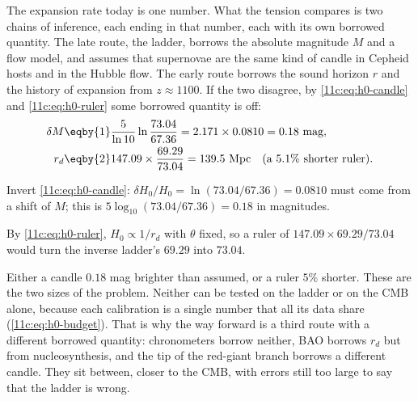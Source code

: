 The expansion rate today is one number. What the tension compares is two chains of
inference, each ending in that number, each with its own borrowed quantity. The late
route, the ladder, borrows the absolute magnitude $M$ and a flow model, and assumes that supernovae are the same
kind of candle in Cepheid hosts and in the Hubble flow. The early route borrows the
sound horizon $r$ and the history of expansion from $z\approx1100$. If the two disagree,
by \eqref{11c:eq:h0-candle} and \eqref{11c:eq:h0-ruler} some borrowed quantity is off:
\begin{align}
  \delta M&\eqby{1}\frac{5}{\ln10}\ln\frac{73.04}{67.36}=2.171\times0.0810=0.18\ \text{mag},\nonumber\\
  r_d&\eqby{2}147.09\times\frac{69.29}{73.04}=139.5\ \text{Mpc}\quad(\text{a } 5.1\%\text{ shorter ruler}).
  \label{11c:eq:h0-closing}
\end{align}
\begin{explain}
  \item Invert \eqref{11c:eq:h0-candle}: $\delta H_0/H_0=\ln(73.04/67.36)=0.0810$ must come from a shift of
        $M$; this is $5\log_{10}(73.04/67.36)=0.18$ in magnitudes.
  \item By \eqref{11c:eq:h0-ruler}, $H_0\propto1/r_d$ with $\theta$ fixed, so a ruler of
        $147.09\times69.29/73.04$ would turn the inverse ladder's $69.29$ into $73.04$.
\end{explain}
Either a candle $0.18$ mag brighter than assumed, or a ruler $5\%$ shorter. These are
the two sizes of the problem. Neither can be tested on the ladder or on the CMB alone,
because each calibration is a single number that all its data share
(\cref{11c:eq:h0-budget}). That is why the way forward is a third route with a different borrowed
quantity: chronometers borrow neither, BAO borrows $r_d$ but from nucleosynthesis, and
the tip of the red-giant branch borrows a different candle. They sit between, closer to
the CMB, with errors still too large to say that the ladder is wrong.

